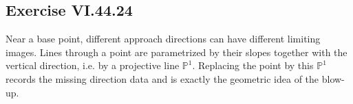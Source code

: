 \subsection*{Exercise VI.44.24}
\begin{solution}
Near a base point, different approach directions can have different limiting images.  Lines through a point are parametrized by their slopes together with the vertical direction, i.e. by a projective line \(\mathbb P^1\).  Replacing the point by this \(\mathbb P^1\) records the missing direction data and is exactly the geometric idea of the blow-up.
\end{solution}

